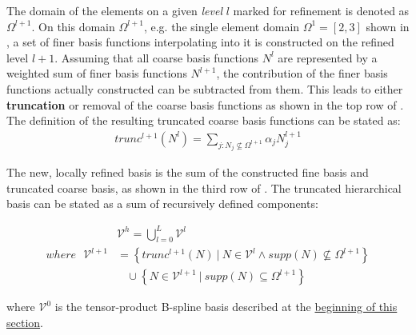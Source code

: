 The domain of the elements on a given \emph{level} $l$ marked for refinement is denoted as $\Omega^{l+1}$. On this domain $\Omega^{l+1}$, e.g. the single element domain $\Omega^{1} = [2,3]$ shown in , a set of finer basis functions interpolating into it is constructed on the refined level $l+1$. Assuming that all coarse basis functions $N^l$ are represented by a weighted sum of finer basis functions $N^{l+1}$, the contribution of the finer basis functions actually constructed can be subtracted from them. This leads to either \textbf{truncation} or removal of the coarse basis functions as shown in the top row of . The definition of the resulting truncated coarse basis functions can be stated as:
\begin{equation}
\label{eqn:truncation}
\begin{split}
    trunc^{l+1}(N^l) = \sum_{j: N_j \nsubseteq \Omega^{l+1}} \alpha_j N_j^{l+1}
\end{split}{}
\end{equation}{}

The new, locally refined basis is the sum of the constructed fine basis and truncated coarse basis, as shown in the third row of . The truncated hierarchical basis can be stated as a sum of recursively defined components:

\begin{equation}
\label{eqn:thb_basis}
\begin{split}
    &\mathcal{V}^{h} = \bigcup_{l=0}^{L} \mathcal{V}^{l} \\
    where ~~~\mathcal{V}^{l+1} &= \left\{ trunc^{l+1}(N) \ | \ N \in \mathcal{V}^l \land supp(N) \nsubseteq \Omega^{l+1}  \right\} \\
    & \ \ \ \ \cup \left\{ N \in \mathcal{V}^{l+1} \ | \ supp(N) \subseteq \Omega^{l+1}  \right\}
\end{split}{}
\end{equation}{}

where $\mathcal{V}^{0}$ is the tensor-product B-spline basis described at the \hyperref[sec:overview_background]{beginning of this section}.

